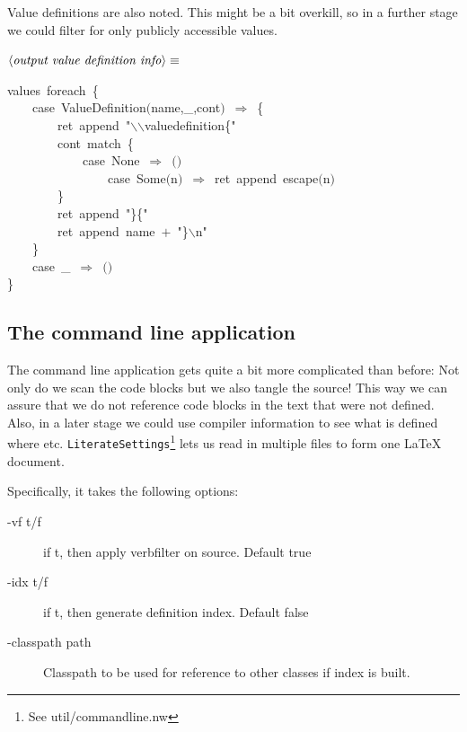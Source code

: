 \documentclass[a4paper,12pt]{article}
\begin{document}
Value definitions are also noted. This might be a bit
overkill, so in a further stage we could filter for only
publicly accessible values.

$\left<\mbox{\emph{output value definition info}}\right>\equiv$
\begin{program}values~foreach~{\small\{}
\\~~~~{\vem case}~ValueDefinition$($name,\_,cont$)$~$\Rightarrow$~{\small\{}
\\~~~~~~~~ret~append~"$\backslash$$\backslash$valuedefinition{\small\{}"
\\~~~~~~~~cont~{\vem match}~{\small\{}
\\~~~~~~~~~~~~{\vem case}~None~$\Rightarrow$~$($$)$
\\~~~~~~~~~~~~~~~~{\vem case}~Some$($n$)$~$\Rightarrow$~ret~append~escape$($n$)$
\\~~~~~~~~{\small\}}
\\~~~~~~~~ret~append~"{\small\}}{\small\{}"
\\~~~~~~~~ret~append~name~$+$~"{\small\}}$\backslash$n"
\\~~~~{\small\}}
\\~~~~{\vem case}~\_~$\Rightarrow$~$($$)$
\\{\small\}}
\\[0.5em]\end{program}


\subsection{The command line application}
The command line application gets quite a bit more complicated than before:
Not only do we scan the code blocks but we also tangle the source! This way
we can assure that we do not reference code blocks in the text that were not
defined. Also, in a later stage we could use compiler information to see
what is defined where etc. \texttt{LiterateSettings}\footnote{See util/commandline.nw}
lets us read in multiple files
to form one LaTeX document.

Specifically, it takes the following options:

\begin{description}
\item[-vf t/f] if t, then apply verbfilter on source. Default true
\item[-idx t/f] if t, then generate definition index. Default false
\item[-classpath path] Classpath to be used for reference to other
classes if index is built.
\end{description}
\end{document}
